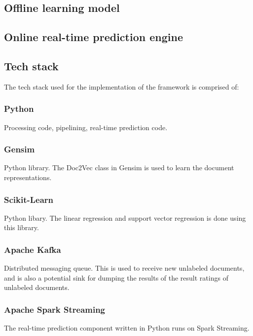 \documentclass[conference]{IEEEtran}
\begin{document}
    \subsection{Offline learning model}


    \subsection{Online real-time prediction engine}


    \subsection{Tech stack} \label{Tech stack}
        The tech stack used for the implementation of the framework is comprised of:

        \subsubsection{Python}
            Processing code, pipelining, real-time prediction code\cite{python}.

        \subsubsection{Gensim}
            Python library. The Doc2Vec class in Gensim is used to learn the document representations\cite{doc2vec_api}.
        
        \subsubsection{Scikit-Learn}
            Python libary. The linear regression and support vector regression is done using this library\cite{scikit_learn}.
        
        \subsubsection{Apache Kafka}
            Distributed messaging queue. This is used to receive new unlabeled documents, and is also a potential sink for dumping the results of the result ratings of unlabeled documents\cite{kreps2011kafka}.
        
        \subsubsection{Apache Spark Streaming}
            The real-time prediction component written in Python runs on Spark Streaming\cite{zaharia2012discretized}.
        
\end{document}
